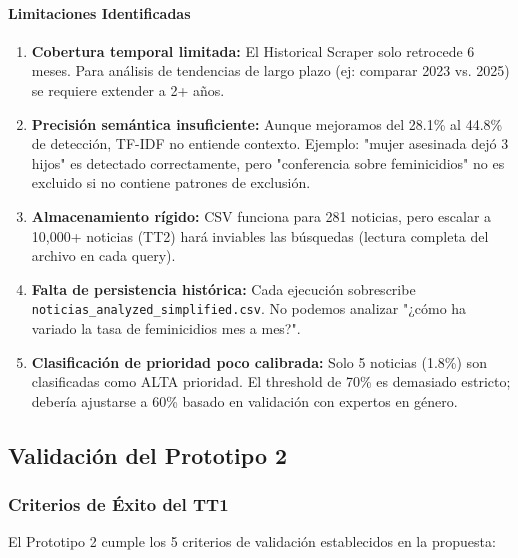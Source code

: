 \paragraph{Limitaciones Identificadas}

\begin{enumerate}
    \item \textbf{Cobertura temporal limitada:} El Historical Scraper solo retrocede 6 meses. Para análisis de tendencias de largo plazo (ej: comparar 2023 vs. 2025) se requiere extender a 2+ años.
    
    \item \textbf{Precisión semántica insuficiente:} Aunque mejoramos del 28.1\% al 44.8\% de detección, TF-IDF no entiende contexto. Ejemplo: "mujer asesinada dejó 3 hijos" es detectado correctamente, pero "conferencia sobre feminicidios" no es excluido si no contiene patrones de exclusión.
    
    \item \textbf{Almacenamiento rígido:} CSV funciona para 281 noticias, pero escalar a 10,000+ noticias (TT2) hará inviables las búsquedas (lectura completa del archivo en cada query).
    
    \item \textbf{Falta de persistencia histórica:} Cada ejecución sobrescribe \texttt{noticias\_analyzed\_simplified.csv}. No podemos analizar "¿cómo ha variado la tasa de feminicidios mes a mes?".
    
    \item \textbf{Clasificación de prioridad poco calibrada:} Solo 5 noticias (1.8\%) son clasificadas como ALTA prioridad. El threshold de 70\% es demasiado estricto; debería ajustarse a 60\% basado en validación con expertos en género.
\end{enumerate}

\subsection{Validación del Prototipo 2}

\subsubsection{Criterios de Éxito del TT1}

El Prototipo 2 cumple los 5 criterios de validación establecidos en la propuesta:

